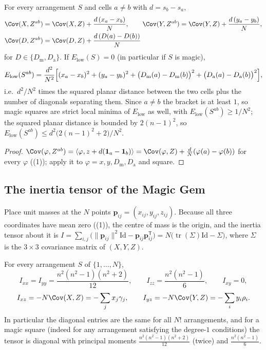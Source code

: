 \begin{proposition}
\label{prop:swap_low}
For every arrangement $S$ and cells $a\ne b$ with $d=s_b-s_a$,
\begin{align*}
\Cov(X,Z^{ab})&=\Cov(X,Z)+\frac{d\,(x_a-x_b)}{N},\qquad
\Cov(Y,Z^{ab})=\Cov(Y,Z)+\frac{d\,(y_a-y_b)}{N},\\
\Cov(D,Z^{ab})&=\Cov(D,Z)+\frac{d\,(D(a)-D(b))}{N}
\end{align*}
for $D\in\{D_{\mathrm m},D_{\mathrm a}\}$.  If $E_{\mathrm{low}}(S)=0$ (in particular if $S$ is magic),
\[
E_{\mathrm{low}}(S^{ab})=\frac{d^{2}}{N^{2}}\Bigl[(x_a-x_b)^{2}+(y_a-y_b)^{2}+\bigl(D_{\mathrm m}(a)-D_{\mathrm m}(b)\bigr)^{2}+\bigl(D_{\mathrm a}(a)-D_{\mathrm a}(b)\bigr)^{2}\Bigr],
\]
i.e.\ $d^{2}/N^{2}$ times the squared planar distance between the two cells plus the number of diagonals separating them.
Since $a\ne b$ the bracket is at least $1$, so magic squares are strict local minima of $E_{\mathrm{low}}$ as well, with
$E_{\mathrm{low}}(S^{ab})\ge1/N^{2}$; the squared planar distance is bounded by $2(n-1)^{2}$, so
$E_{\mathrm{low}}(S^{ab})\le d^{2}\bigl(2(n-1)^{2}+2\bigr)/N^{2}$.
\end{proposition}

\begin{proof}
$\Cov(\varphi,Z^{ab})=\langle\varphi,z+d(\mathbf 1_a-\mathbf 1_b)\rangle=\Cov(\varphi,Z)+\frac dN(\varphi(a)-\varphi(b))$
for every $\varphi$ ((1)); apply it to $\varphi=x,y,D_{\mathrm m},D_{\mathrm a}$ and square.
\end{proof}

\subsection{The inertia tensor of the Magic Gem}
\label{sec:theory_inertia}

Place unit masses at the $N$ points $\mathbf p_{ij}=(x_{ij},y_{ij},z_{ij})$.  Because all three coordinates have mean
zero ((1)), the centre of mass is the origin, and the inertia tensor about it is
$I=\sum_{i,j}\bigl(\|\mathbf p_{ij}\|^{2}\mathrm{Id}-\mathbf p_{ij}\mathbf p_{ij}^{\mathsf T}\bigr)=N\bigl(\operatorname{tr}(\Sigma)\mathrm{Id}-\Sigma\bigr)$,
where $\Sigma$ is the $3\times3$ covariance matrix of $(X,Y,Z)$.

\begin{proposition}
\label{prop:inertia}
For every arrangement $S$ of $\{1,\dots,N\}$,
\[
I_{xx}=I_{yy}=\frac{n^{2}(n^{2}-1)(n^{2}+2)}{12},\qquad I_{zz}=\frac{n^{2}(n^{2}-1)}{6},\qquad I_{xy}=0,
\]
\[
I_{xz}=-N\Cov(X,Z)=-\sum_jx_j\gamma_j,\qquad I_{yz}=-N\Cov(Y,Z)=-\sum_iy_i\rho_i .
\]
In particular the diagonal entries are the same for all $N!$ arrangements, and for a magic square (indeed for any
arrangement satisfying the degree-$1$ conditions) the tensor is diagonal with principal moments
$\frac{n^{2}(n^{2}-1)(n^{2}+2)}{12}$ (twice) and $\frac{n^{2}(n^{2}-1)}{6}$.
\end{proposition}

